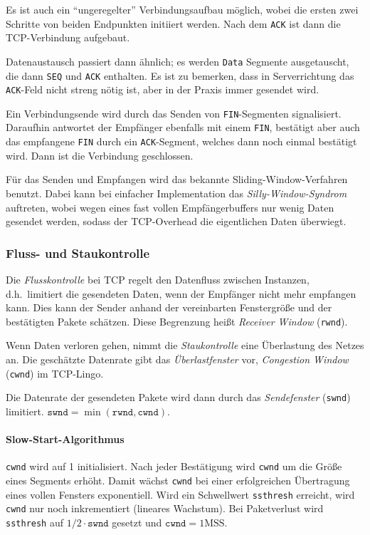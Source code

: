 \documentclass[a4paper,parskip=half*,DIV=15,fontsize=11pt]{scrartcl}
\begin{document}
Es ist auch ein ``ungeregelter'' Verbindungsaufbau möglich, wobei die ersten zwei Schritte von beiden Endpunkten initiiert werden. Nach dem \lstinline{ACK} ist dann die TCP-Verbindung aufgebaut.

Datenaustausch passiert dann ähnlich; es werden \lstinline{Data} Segmente ausgetauscht, die dann \lstinline{SEQ} und \lstinline{ACK} enthalten. Es ist zu bemerken, dass in Serverrichtung das \lstinline{ACK}-Feld nicht streng nötig ist, aber in der Praxis immer gesendet wird.

Ein Verbindungsende wird durch das Senden von \lstinline{FIN}-Segmenten signalisiert. Daraufhin antwortet der Empfänger ebenfalls mit einem \lstinline{FIN}, bestätigt aber auch das empfangene \lstinline{FIN} durch ein \lstinline{ACK}-Segment, welches dann noch einmal bestätigt wird. Dann ist die Verbindung geschlossen.

Für das Senden und Empfangen wird das bekannte Sliding-Window-Verfahren benutzt. Dabei kann bei einfacher Implementation das \emph{Silly-Window-Syndrom} auftreten, wobei wegen eines fast vollen Empfängerbuffers nur wenig Daten gesendet werden, sodass der TCP-Overhead die eigentlichen Daten überwiegt.

\subsubsection{Fluss- und Staukontrolle}

Die \emph{Flusskontrolle} bei TCP regelt den Datenfluss zwischen Instanzen, d.h.\ limitiert die gesendeten Daten, wenn der Empfänger nicht mehr empfangen kann. Dies kann der Sender anhand der vereinbarten Fenstergröße und der bestätigten Pakete schätzen. Diese Begrenzung heißt \emph{Receiver Window} (\lstinline{rwnd}).

Wenn Daten verloren gehen, nimmt die \emph{Staukontrolle} eine Überlastung des Netzes an. Die geschätzte Datenrate gibt das \emph{Überlastfenster} vor, \emph{Congestion Window} (\lstinline{cwnd}) im TCP-Lingo.

Die Datenrate der gesendeten Pakete wird dann durch das \emph{Sendefenster} (\lstinline{swnd}) limitiert. $\texttt{swnd} = \min(\texttt{rwnd}, \texttt{cwnd})$.

\paragraph{Slow-Start-Algorithmus}

\lstinline{cwnd} wird auf 1 initialisiert. Nach jeder Bestätigung wird \lstinline{cwnd} um die Größe eines Segments erhöht. Damit wächst \lstinline{cwnd} bei einer erfolgreichen Übertragung eines vollen Fensters exponentiell. Wird ein Schwellwert \lstinline{ssthresh} erreicht, wird \lstinline{cwnd} nur noch inkrementiert (lineares Wachstum). Bei Paketverlust wird \lstinline{ssthresh} auf $1/2 \cdot \texttt{swnd}$ gesetzt und $\texttt{cwnd} = 1 \mathrm{ MSS}$.
\end{document}
